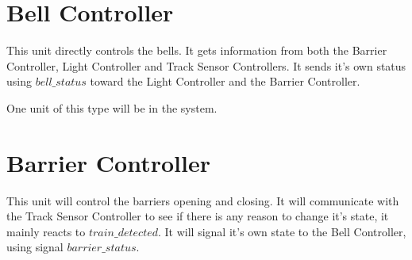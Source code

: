 \documentclass[final]{report}
\begin{document}
\section{Bell Controller}
This unit directly controls the bells.
It gets information from both the Barrier Controller, Light Controller and Track Sensor Controllers.
It sends it's own status using $bell\_status$ toward the Light Controller and the Barrier Controller.

One unit of this type will be in the system.

\section{Barrier Controller}
This unit will control the barriers opening and closing.
It will communicate with the Track Sensor Controller to see if there is any reason to change it's state, it mainly reacts to $train\_detected$.
It will signal it's own state to the Bell Controller, using signal $barrier\_status$.
\end{document}
